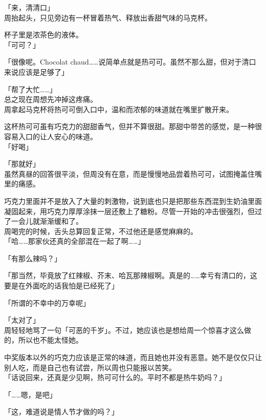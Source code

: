 「来，清清口」\\

周抬起头，只见旁边有一杯冒着热气、释放出香甜气味的马克杯。

杯子里是浓茶色的液体。\\

「可可？」

「很像呢。Chocolat chaud……说简单点就是热可可。虽然不那么甜，但对于清口来说应该是足够了」

「帮了大忙……」\\

总之现在周想先冲掉这疼痛。\\

周拿起马克杯将热可可倒入口中，温和而浓郁的味道就在嘴里扩散开来。

这杯热可可虽有巧克力的甜甜香气，但并不算很甜。那甜中带苦的感觉，是一种很容易入口的让人安心的味道。\\

「好喝」

「那就好」\\

虽然真昼的回答很平淡，但周没有在意，而是慢慢地品尝着热可可，试图掩盖住嘴里的痛感。

巧克力里面并不是放入了大量的刺激物，说到底也只是把那些东西混到生奶油里面凝固起来，用巧克力厚厚涂抹一层还敷上了糖粉。尽管一开始的冲击很强烈，但过了一会儿就渐渐缓和了。\\

周喝完的时候，舌头总算回复正常，不过他还是感觉麻麻的。\\

「哈……那家伙还真的全部混在一起了啊……」

「有那么辣吗？」

「那当然，毕竟放了红辣椒、芥末、哈瓦那辣椒啊。真是的……幸亏有清口的，这要是在外面吃的话我怕是已经死了」

「所谓的不幸中的万幸呢」

「太对了」\\

周轻轻地骂了一句「可恶的千岁」。不过，她应该也是想给周一个惊喜才这么做的，所以也不能太怪她。

中奖版本以外的巧克力应该是正常的味道，而且她也并没有恶意。她不是仅仅只让别人吃，而是自己也有试尝，所以周也只能报以苦笑。\\

「话说回来，还真是少见啊，热可可什么的。平时不都是热牛奶吗？」

「……嗯，是吧」

「这，难道说是情人节才做的吗？」\\

